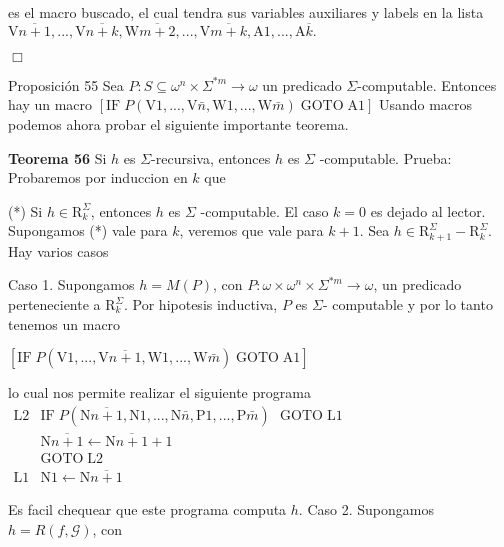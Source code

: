 es el macro buscado, el cual tendra sus variables auxiliares y labels en la lista
\(\displaystyle \mathrm{V}\overline{n+1},...,\mathrm{V}\overline{n+k},\mathrm{W}\overline{m+2 },...,\mathrm{V}\overline{m+k},\mathrm{A}1,...,\mathrm{A}\overline{k}. \)

\(\Box\)




Proposición 55 Sea \(P:S\subseteq \omega ^{n}\times \Sigma ^{\ast m}\rightarrow \omega \) un predicado \(\Sigma \)-computable. Entonces hay un macro
\(\displaystyle \left[ \mathrm{IF}\;P(\mathrm{V}1,...,\mathrm{V}\bar{n},\mathrm{W}1,..., \mathrm{W}\bar{m})\;\mathrm{GOTO}\;\mathrm{A}1\right] \)
Usando macros podemos ahora probar el siguiente importante teorema.




\textbf{Teorema 56} Si \(h\) es \(\Sigma \)-recursiva, entonces \(h\) es \(\Sigma \) -computable.
Prueba: Probaremos por induccion en \(k\) que

(*) Si \(h\in \mathrm{R}_{k}^{\Sigma }\), entonces \(h\) es \(\Sigma \) -computable.
El caso \(k=0\) es dejado al lector. Supongamos (*) vale para \(k\), veremos que vale para \(k+1\). Sea \(h\in \mathrm{R}_{k+1}^{\Sigma }-\mathrm{R} _{k}^{\Sigma }.\) Hay varios casos

Caso 1. Supongamos \(h=M(P)\), con \(P:\omega \times \omega ^{n}\times \Sigma ^{\ast m}\rightarrow \omega \), un predicado perteneciente a \(\mathrm{R} _{k}^{\Sigma }\). Por hipotesis inductiva, \(P\) es \(\Sigma \)- computable y por lo tanto tenemos un macro

\(\displaystyle \left[ \mathrm{IF}\;P(\mathrm{V}1,...,\mathrm{V}\overline{n+1},\mathrm{W} 1,...,\mathrm{W}\bar{m})\;\mathrm{GOTO}\;\mathrm{A}1\right] \)

lo cual nos permite realizar el siguiente programa
\(\displaystyle \begin{array}{ll} \mathrm{L}2 & \mathrm{IF}\;P(\mathrm{N}\overline{n+1},\mathrm{N}1,..., \mathrm{N}\bar{n},\mathrm{P}1,...,\mathrm{P}\bar{m})\text{\ }\mathrm{GOTO}\; \mathrm{L}1 \\ & \mathrm{N}\overline{n+1}\leftarrow \mathrm{N}\overline{n+1}+1 \\ & \mathrm{GOTO}\;\mathrm{L}2 \\ \mathrm{L}1 & \mathrm{N}1\leftarrow \mathrm{N}\overline{n+1} \end{array} \)

Es facil chequear que este programa computa \(h.\)
Caso 2. Supongamos \(h=R(f,\mathcal{G})\), con

